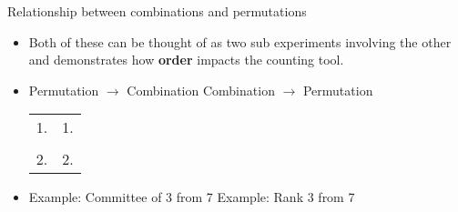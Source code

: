\documentclass{article}
\begin{document}
Relationship between combinations and permutations\bigskip
\begin{itemize}
    \item Both of these can be thought of as two sub experiments involving the other and demonstrates how \textbf{order} impacts the counting tool.\\
    \item[] Permutation $\longrightarrow$ Combination \hfill Combination $\longrightarrow$ Permutation \bigskip\\
    \begin{tabular}{l l}
        1. \hspace{215pt} & 1. \\\\
        2. \hspace{215pt} & 2. \\
    \end{tabular}\vspace{60pt}
    \item[] Example: Committee of 3 from 7 \hspace{90pt} Example: Rank 3 from 7\vspace{200pt}
\end{itemize}\bigskip
\end{document}

